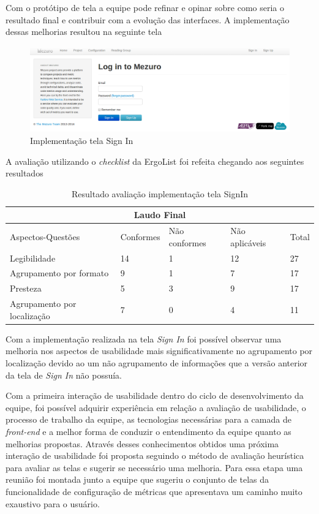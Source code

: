 Com o protótipo de tela a equipe pode refinar e opinar sobre como seria o resultado final e contribuir com a evolução das interfaces. A implementação dessas melhorias resultou na seguinte tela

\graphicspath{{figuras/}}
\begin{figure}[H]
\centering
\includegraphics[width=1.0\textwidth]{TelaSignIn}
\caption{Implementação tela Sign In}
\label{parallel-coordinate}
\end{figure}

A avaliação utilizando o \textit{checklist} da ErgoList foi refeita chegando aos seguintes resultados

\begin{table}[h]
\begin{tabular}{|l|l|l|l|l|}
\hline
\multicolumn{5}{|c|}{\textbf{Laudo Final}}                                       \\ \hline
Aspectos-Questões           & Conformes & Não conformes & Não aplicáveis & Total \\ \hline
Legibilidade                & 14        & 1             & 12             & 27    \\ \hline
Agrupamento por formato     & 9         & 1             & 7              & 17    \\ \hline
Presteza                    & 5         & 3             & 9              & 17    \\ \hline
Agrupamento por localização & 7         & 0             & 4              & 11    \\ \hline
\end{tabular}
\caption{Resultado avaliação implementação tela SignIn}
\end{table}

Com a implementação realizada na tela \textit{Sign In} foi possível observar uma melhoria nos aspectos de usabilidade mais significativamente no agrupamento por localização devido ao um não agrupamento de informações que a versão anterior da tela de \textit{Sign In} não possuía.

Com a primeira interação de usabilidade dentro do ciclo de desenvolvimento da equipe, foi possível adquirir experiência em relação a avaliação de usabilidade, o processo de trabalho da equipe, as tecnologias necessárias para a camada de \textit{front-end} e a melhor forma de conduzir o entendimento da equipe quanto as melhorias propostas. Através desses conhecimentos obtidos uma próxima interação de usabilidade foi proposta seguindo o método de avaliação heurística para avaliar as telas e sugerir se necessário uma melhoria. Para essa etapa uma reunião foi montada junto a equipe que sugeriu o conjunto de telas da funcionalidade de configuração de métricas que apresentava um caminho muito exaustivo para o usuário.

